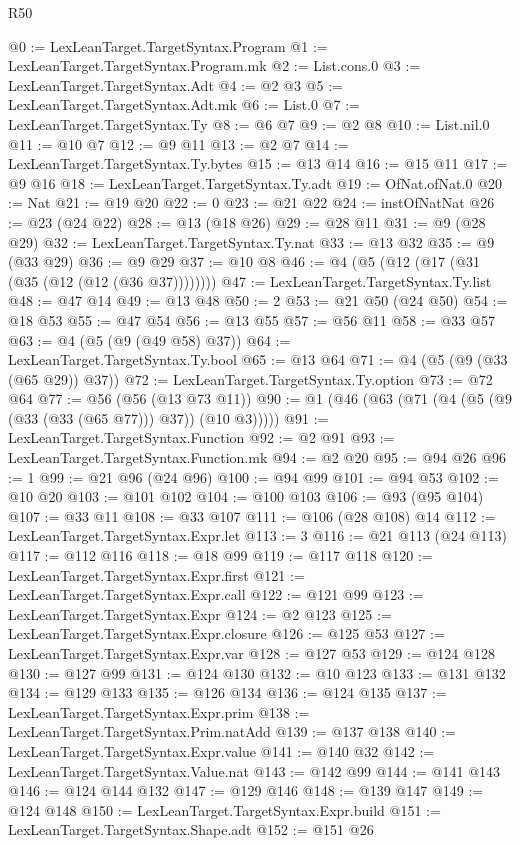 \begin{lexlean}{R50}
\begin{coremodule}
@0 := LexLeanTarget.TargetSyntax.Program
@1 := LexLeanTarget.TargetSyntax.Program.mk
@2 := List.cons.{0}
@3 := LexLeanTarget.TargetSyntax.Adt
@4 := @2 @3
@5 := LexLeanTarget.TargetSyntax.Adt.mk
@6 := List.{0}
@7 := LexLeanTarget.TargetSyntax.Ty
@8 := @6 @7
@9 := @2 @8
@10 := List.nil.{0}
@11 := @10 @7
@12 := @9 @11
@13 := @2 @7
@14 := LexLeanTarget.TargetSyntax.Ty.bytes
@15 := @13 @14
@16 := @15 @11
@17 := @9 @16
@18 := LexLeanTarget.TargetSyntax.Ty.adt
@19 := OfNat.ofNat.{0}
@20 := Nat
@21 := @19 @20
@22 := 0
@23 := @21 @22
@24 := instOfNatNat
@26 := @23 (@24 @22)
@28 := @13 (@18 @26)
@29 := @28 @11
@31 := @9 (@28 @29)
@32 := LexLeanTarget.TargetSyntax.Ty.nat
@33 := @13 @32
@35 := @9 (@33 @29)
@36 := @9 @29
@37 := @10 @8
@46 := @4 (@5 (@12 (@17 (@31 (@35 (@12 (@12 (@36 @37))))))))
@47 := LexLeanTarget.TargetSyntax.Ty.list
@48 := @47 @14
@49 := @13 @48
@50 := 2
@53 := @21 @50 (@24 @50)
@54 := @18 @53
@55 := @47 @54
@56 := @13 @55
@57 := @56 @11
@58 := @33 @57
@63 := @4 (@5 (@9 (@49 @58) @37))
@64 := LexLeanTarget.TargetSyntax.Ty.bool
@65 := @13 @64
@71 := @4 (@5 (@9 (@33 (@65 @29)) @37))
@72 := LexLeanTarget.TargetSyntax.Ty.option
@73 := @72 @64
@77 := @56 (@56 (@13 @73 @11))
@90 := @1 (@46 (@63 (@71 (@4 (@5 (@9 (@33 (@33 (@65 @77))) @37)) (@10 @3)))))
@91 := LexLeanTarget.TargetSyntax.Function
@92 := @2 @91
@93 := LexLeanTarget.TargetSyntax.Function.mk
@94 := @2 @20
@95 := @94 @26
@96 := 1
@99 := @21 @96 (@24 @96)
@100 := @94 @99
@101 := @94 @53
@102 := @10 @20
@103 := @101 @102
@104 := @100 @103
@106 := @93 (@95 @104)
@107 := @33 @11
@108 := @33 @107
@111 := @106 (@28 @108) @14
@112 := LexLeanTarget.TargetSyntax.Expr.let
@113 := 3
@116 := @21 @113 (@24 @113)
@117 := @112 @116
@118 := @18 @99
@119 := @117 @118
@120 := LexLeanTarget.TargetSyntax.Expr.first
@121 := LexLeanTarget.TargetSyntax.Expr.call
@122 := @121 @99
@123 := LexLeanTarget.TargetSyntax.Expr
@124 := @2 @123
@125 := LexLeanTarget.TargetSyntax.Expr.closure
@126 := @125 @53
@127 := LexLeanTarget.TargetSyntax.Expr.var
@128 := @127 @53
@129 := @124 @128
@130 := @127 @99
@131 := @124 @130
@132 := @10 @123
@133 := @131 @132
@134 := @129 @133
@135 := @126 @134
@136 := @124 @135
@137 := LexLeanTarget.TargetSyntax.Expr.prim
@138 := LexLeanTarget.TargetSyntax.Prim.natAdd
@139 := @137 @138
@140 := LexLeanTarget.TargetSyntax.Expr.value
@141 := @140 @32
@142 := LexLeanTarget.TargetSyntax.Value.nat
@143 := @142 @99
@144 := @141 @143
@146 := @124 @144 @132
@147 := @129 @146
@148 := @139 @147
@149 := @124 @148
@150 := LexLeanTarget.TargetSyntax.Expr.build
@151 := LexLeanTarget.TargetSyntax.Shape.adt
@152 := @151 @26

\end{coremodule}
\end{lexlean}
